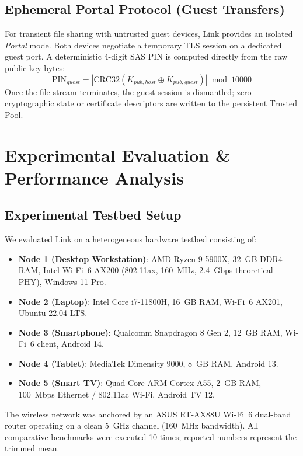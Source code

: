 \documentclass[conference]{IEEEtran}
\begin{document}
\subsection{Ephemeral Portal Protocol (Guest Transfers)}
For transient file sharing with untrusted guest devices, Link provides an isolated \textit{Portal} mode. Both devices negotiate a temporary TLS session on a dedicated guest port. A deterministic 4-digit SAS PIN is computed directly from the raw public key bytes:
\begin{equation}
\text{PIN}_{guest} = \left| \text{CRC32}\left( K_{pub, host} \oplus K_{pub, guest} \right) \right| \bmod 10000
\end{equation}
Once the file stream terminates, the guest session is dismantled; zero cryptographic state or certificate descriptors are written to the persistent Trusted Pool.

\section{Experimental Evaluation \& Performance Analysis}
\label{sec:evaluation}

\subsection{Experimental Testbed Setup}
We evaluated Link on a heterogeneous hardware testbed consisting of:
\begin{itemize}
    \item \textbf{Node 1 (Desktop Workstation)}: AMD Ryzen 9 5900X, 32~GB DDR4 RAM, Intel Wi-Fi~6 AX200 (802.11ax, 160~MHz, 2.4~Gbps theoretical PHY), Windows 11 Pro.
    \item \textbf{Node 2 (Laptop)}: Intel Core i7-11800H, 16~GB RAM, Wi-Fi~6 AX201, Ubuntu 22.04 LTS.
    \item \textbf{Node 3 (Smartphone)}: Qualcomm Snapdragon 8 Gen 2, 12~GB RAM, Wi-Fi~6 client, Android 14.
    \item \textbf{Node 4 (Tablet)}: MediaTek Dimensity 9000, 8~GB RAM, Android 13.
    \item \textbf{Node 5 (Smart TV)}: Quad-Core ARM Cortex-A55, 2~GB RAM, 100~Mbps Ethernet / 802.11ac Wi-Fi, Android TV 12.
\end{itemize}
The wireless network was anchored by an ASUS RT-AX88U Wi-Fi~6 dual-band router operating on a clean 5~GHz channel (160~MHz bandwidth). All comparative benchmarks were executed 10 times; reported numbers represent the trimmed mean.
\end{document}
